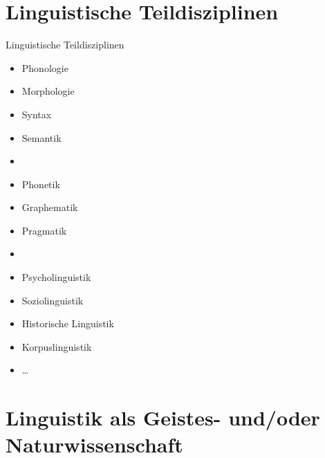 %
\section{Linguistische Teildisziplinen}		

\begin{frame}{Linguistische Teildisziplinen}

	\begin{itemize}
		\item Phonologie
		\item Morphologie
		\item Syntax
		\item Semantik
		\item[]
		\item Phonetik
		\item Graphematik
		\item Pragmatik
		\item[]
		\item Psycholinguistik
		\item Soziolinguistik
		\item Historische Linguistik
		\item Korpuslinguistik
		\item \dots
	\end{itemize}
	
\end{frame}



%
\section{Linguistik als Geistes- und/oder Naturwissenschaft}		



